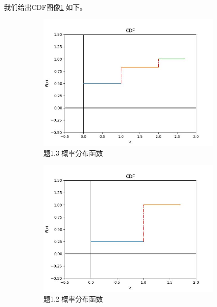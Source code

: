 \documentclass{article}
\begin{document}
	我们给出CDF图像\ref{fig:1-3-CDF} 如下。
	
	
	\begin{figure}[!ht]
		\centering
		\caption{概率分布函数}
		\label{fig:CDF function}
		\begin{subfigure}[b]{0.4\textwidth}
			\includegraphics[width=\textwidth]{figure/1-3-CDF}
			\caption{题1.3 概率分布函数}
			\label{fig:1-3-CDF}
		\end{subfigure}
		\begin{subfigure}[b]{0.4\textwidth}
			\includegraphics[width=\textwidth]{figure/1-2-CDF}
			\caption{题1.2 概率分布函数}
			\label{fig:1-2-CDF}
		\end{subfigure}
		\hfill
		\begin{subfigure}[b]{0.4\textwidth}

\end{subfigure}
\end{figure}
\end{document}

